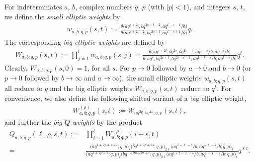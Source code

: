\documentclass[pdftex]{sigma}
\numberwithin{equation}{section}
\theoremstyle{definition}
\newcommand{\ta}{\theta}
\begin{document}
For indeterminates $a$, $b$, complex numbers $q$, $p$ (with $|p|<1$),
and integers $s$, $t$, we define the \textit{small elliptic weights} by
\begin{gather}\label{wdef}
w_{a,b;q,p}(s,t):=
\frac{\ta\bigl(aq^{s+2t},bq^{2s+t-2},aq^{t-s-1}/b\bigr)}
{\ta\bigl(aq^{s+2t-2},bq^{2s+t},aq^{t-s+1}/b\bigr)}q.
\end{gather}
The corresponding \textit{big elliptic weights} are defined by
\begin{gather}\label{Wdef}
W_{a,b;q,p}(s,t):=\prod_{j=1}^tw_{a,b;q,p}(s,j)
=\frac{\ta\bigl(aq^{s+2t},bq^{2s},bq^{2s-1},aq^{1-s}/b,aq^{-s}/b\bigr)}
{\ta\bigl(aq^s,bq^{2s+t},bq^{2s+t-1},aq^{1+t-s}/b,aq^{t-s}/b\bigr)}q^t.
\end{gather}
Clearly, $W_{a,b;q,p}(s,0)=1$, for all $s$.
For $p\to 0$ followed by $a\to 0$ and $b\to 0$
(or $p\to 0$ followed by $b\to \infty$ and $a\to \infty$),
the small elliptic weights $w_{a,b;q,p}(s,t)$ all reduce to $q$
and the big elliptic weights $W_{a,b;q,p}(s,t)$ reduce to $q^t$.
For convenience, we also define the following shifted variant of
a big elliptic weight,
\begin{gather}\label{sWdef}
W_{a,b;q,p}^{(\rho)}(s,t):=W_{aq^{2\rho},bq^{2\rho};q,p}(s,t),
\end{gather}
and further the \textit{big $Q$-weights} by the product
\begin{align}
Q_{a,b;q,p}(\ell,\rho,s,t):={}& \prod_{i=1}^\ell
W_{a,b;q,p}^{(\rho)}(i+s,t)\label{Qweights}\\
={}&\frac{\bigl(aq^{1+2\rho+s+t};q,p\bigr)_\ell \bigl(bq^{1+2\rho+2s};q,p\bigr)_{2\ell}
\bigl(aq^{1-\ell-s}/b,aq^{-\ell-s}/b;q,p\bigr)_\ell}
{\bigl(aq^{1+2\rho+s};q,p\bigr)_\ell \bigl(bq^{1+2\rho+2s+t};q,p\bigr)_{2\ell}
\bigl(aq^{1+t-\ell-s}/b,aq^{t-\ell-s}/b;q,p)_\ell}q^{\ell t}.\nonumber
\end{align}
\end{document}
